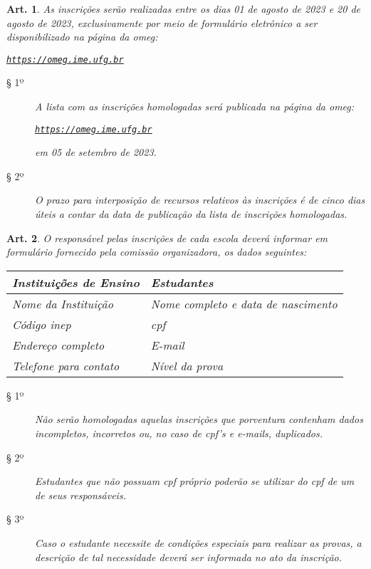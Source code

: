 \documentclass[a4paper,12pt]{article}
\newtheorem{article}{Art.}
\def\url{https://omeg.ime.ufg.br}
\def\homepage{\href{\url}{\texttt{\url}}}
\def\year{2023}
\def\registrationOpening{01 de agosto de \year}
\def\registrationClosing{20 de agosto de \year}
\def\publicationOfAprovedRegistrations{05 de setembro de \year}
\begin{document}
\begin{article}
  As inscrições serão realizadas entre os dias \registrationOpening{} e
  \registrationClosing, exclusivamente por meio de formulário eletrônico
  a ser disponibilizado na página da \acrshort{omeg}:
  \begin{center}
    \homepage
  \end{center}
  \begin{description}
    \item[§ 1º]
      A lista com as inscrições homologadas será publicada na página da
      \acrshort{omeg}:
      \begin{center}
        \homepage
      \end{center}
      em \publicationOfAprovedRegistrations{}.
    \item[§ 2º]
      O prazo para interposição de recursos relativos às inscrições é de cinco
      dias úteis a contar da data de publicação da lista de inscrições
      homologadas.
  \end{description}
\end{article}

\begin{article}
  O responsável pelas inscrições de cada escola deverá informar em formulário
  fornecido pela comissão organizadora, os dados seguintes:

  \begin{table}[H]
    \centering
    \begin{tabular}{l|l}
      \textbf{Instituições de Ensino} & \textbf{Estudantes}                \\ \hline
      Nome da Instituição             & Nome completo e data de nascimento \\
      Código \acrshort{inep}          & \acrshort{cpf}                     \\
      Endereço completo               & E-mail                             \\
      Telefone para contato           & Nível da prova
    \end{tabular}
  \end{table}

  \begin{description}
    \item[§ 1º]
      Não serão homologadas aquelas inscrições que porventura contenham dados
      incompletos, incorretos ou, no caso de \acrshort{cpf}'s e e-mails,
      duplicados.
    \item[§ 2º]
      Estudantes que não possuam \acrshort{cpf} próprio poderão se utilizar do
      \acrshort{cpf} de um de seus responsáveis.
    \item[§ 3º]
      Caso o estudante necessite de condições especiais para realizar as
      provas, a descrição de tal necessidade deverá ser informada no ato da
      inscrição.
  \end{description}
\end{article}
\end{document}
